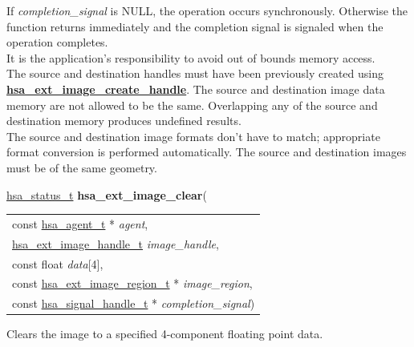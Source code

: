 \documentclass[final]{book}
\newcommand{\hsaarg}[1]{\textit{#1}}
\newcommand{\reffun}[1]{\textbf{#1}}
\begin{document}
If \textit{completion_signal} is NULL, the operation occurs synchronously. Otherwise the function returns immediately and the completion signal is signaled when the operation completes.\\[2mm]
It is the application's responsibility to avoid out of bounds memory access.\\[2mm]
The source and destination handles must have been previously created using \hyperlink{group__images_1gaab643889d22ca4ea75ab16968c15c877}{\reffun{hsa_ext_image_create_handle}}. The source and destination image data memory are not allowed to be the same. Overlapping any of the source and destination memory produces undefined results.\\[2mm]
The source and destination image formats don't have to match; appropriate format conversion is performed automatically. The source and destination images must be of the same geometry. 


\noindent\begin{tcolorbox}[breakable,nobeforeafter,colframe=white,colback=lightgray,left=0mm]
\hyperlink{group__status_1gad755322e7ff95456520e8abdbe90d225}{hsa_status_t} \hypertarget{group__images_1gab56ce39eeb5aeec36576d18ad04df2d0}{\textbf{hsa_ext_image_clear}}(
\vspace{-3.5mm}\begin{longtable}{@{}p{\textwidth}}
\hspace{1.7em}const \hyperlink{group__topology_1gab8db3fb886332a24acac08ec361e1d86}{hsa_agent_t} * \hsaarg{agent},\\
\hspace{1.7em}\hyperlink{group__images_1gae59456dc07140b58a2d526bcf01d2d88}{hsa_ext_image_handle_t} \hsaarg{image_handle},\\
\hspace{1.7em}const float \hsaarg{data}[4],\\
\hspace{1.7em}const \hyperlink{group__images_1gada3adaf96ca2ddac605280cae6470b73}{hsa_ext_image_region_t} * \hsaarg{image_region},\\
\hspace{1.7em}const \hyperlink{group__signals_1ga6592c136d70853d855bc11d9efdbf534}{hsa_signal_handle_t} * \hsaarg{completion_signal})\end{longtable}

\end{tcolorbox}
Clears the image to a specified 4-component floating point data.
\end{document}
